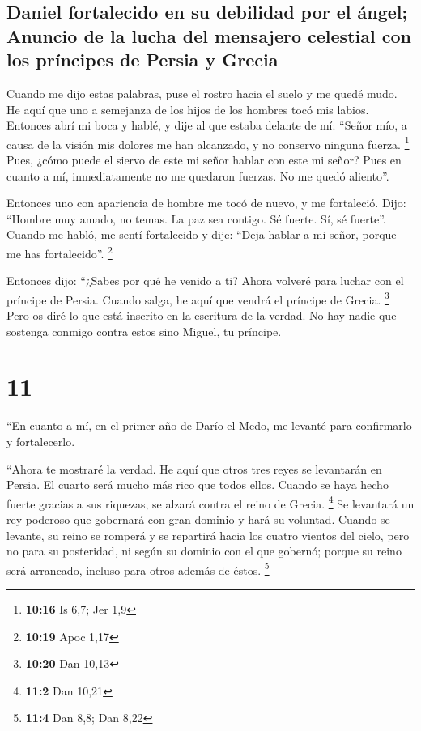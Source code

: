 \hypertarget{daniel-fortalecido-en-su-debilidad-por-el-uxe1ngel-anuncio-de-la-lucha-del-mensajero-celestial-con-los-pruxedncipes-de-persia-y-grecia}{%
\subsection{Daniel fortalecido en su debilidad por el ángel; Anuncio de
la lucha del mensajero celestial con los príncipes de Persia y
Grecia}\label{daniel-fortalecido-en-su-debilidad-por-el-uxe1ngel-anuncio-de-la-lucha-del-mensajero-celestial-con-los-pruxedncipes-de-persia-y-grecia}}

 Cuando me dijo estas palabras, puse el rostro hacia el
suelo y me quedé mudo.  He aquí que uno a semejanza de
los hijos de los hombres tocó mis labios. Entonces abrí mi boca y hablé,
y dije al que estaba delante de mí: ``Señor mío, a causa de la visión
mis dolores me han alcanzado, y no conservo ninguna fuerza. \footnote{\textbf{10:16}
  Is 6,7; Jer 1,9}  Pues, ¿cómo puede el siervo de este
mi señor hablar con este mi señor? Pues en cuanto a mí, inmediatamente
no me quedaron fuerzas. No me quedó aliento''.

 Entonces uno con apariencia de hombre me tocó de nuevo,
y me fortaleció.  Dijo: ``Hombre muy amado, no temas. La
paz sea contigo. Sé fuerte. Sí, sé fuerte''. Cuando me habló, me sentí
fortalecido y dije: ``Deja hablar a mi señor, porque me has
fortalecido''. \footnote{\textbf{10:19} Apoc 1,17}

 Entonces dijo: ``¿Sabes por qué he venido a ti? Ahora
volveré para luchar con el príncipe de Persia. Cuando salga, he aquí que
vendrá el príncipe de Grecia. \footnote{\textbf{10:20} Dan 10,13}
 Pero os diré lo que está inscrito en la escritura de la
verdad. No hay nadie que sostenga conmigo contra estos sino Miguel, tu
príncipe.

\hypertarget{section-10}{%
\section{11}\label{section-10}}

 ``En cuanto a mí, en el primer año de Darío el Medo, me
levanté para confirmarlo y fortalecerlo.

 ``Ahora te mostraré la verdad. He aquí que otros tres
reyes se levantarán en Persia. El cuarto será mucho más rico que todos
ellos. Cuando se haya hecho fuerte gracias a sus riquezas, se alzará
contra el reino de Grecia. \footnote{\textbf{11:2} Dan 10,21}
 Se levantará un rey poderoso que gobernará con gran
dominio y hará su voluntad.  Cuando se levante, su reino
se romperá y se repartirá hacia los cuatro vientos del cielo, pero no
para su posteridad, ni según su dominio con el que gobernó; porque su
reino será arrancado, incluso para otros además de éstos. \footnote{\textbf{11:4}
  Dan 8,8; Dan 8,22}

